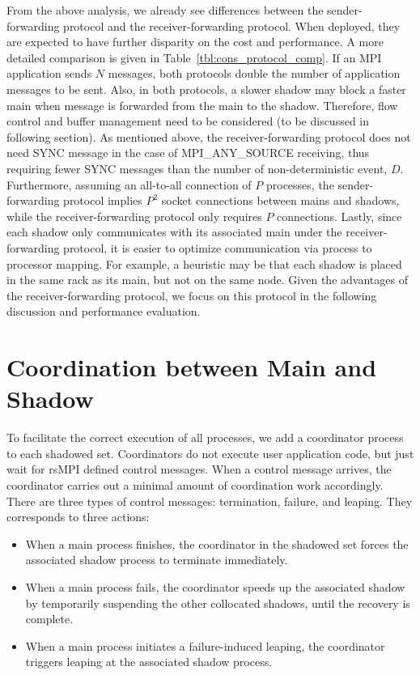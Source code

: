 From the above analysis, we already see differences between the sender-forwarding protocol and the receiver-forwarding protocol. When deployed, they are expected to have further disparity on the cost and performance. 
A more detailed comparison is given in Table~\ref{tbl:cons_protocol_comp}. If an MPI application sends $N$ messages, both protocols double the number of application messages to be sent. Also, in both protocols, a slower shadow may block a faster main when message is forwarded from the main to the shadow. Therefore, flow control and buffer management need to be considered (to be discussed in following section). As mentioned above, the receiver-forwarding protocol does not need SYNC message in the case of MPI\_ANY\_SOURCE receiving, thus requiring fewer SYNC messages than the number of non-deterministic event, $D$. Furthermore, assuming an all-to-all connection of $P$ processes, the sender-forwarding protocol implies $P^2$ socket connections between mains and shadows, while the receiver-forwarding protocol only requires $P$ connections. Lastly, since each shadow only communicates with its associated main under the receiver-forwarding protocol, it is easier to optimize communication via process to processor mapping. For example, a heuristic may be that each shadow is placed in the same rack as its main, but not on the same node. Given the advantages of the receiver-forwarding protocol, we focus on this protocol in the following discussion and performance evaluation.



\section{Coordination between Main and Shadow}
To facilitate the correct execution of all processes, we add a coordinator process to each shadowed set. 
Coordinators do not execute user application code, but just wait for rsMPI defined control messages. When a control message arrives, the coordinator carries out a minimal amount of coordination work accordingly. There are three types of control messages: termination, failure, and leaping. They corresponds to three actions:
\begin{itemize}
  \item When a main process finishes, the coordinator in the shadowed set forces the associated shadow process to terminate immediately.
  \item When a main process fails, the coordinator speeds up the associated shadow by temporarily suspending the other collocated shadows, until the recovery is complete.
  \item When a main process initiates a failure-induced leaping, the coordinator triggers leaping at the associated shadow process.
\end{itemize}


